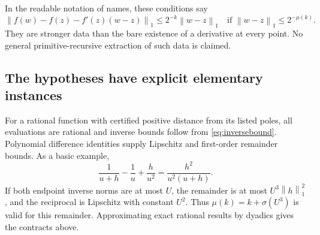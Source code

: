 \documentclass[11pt]{article}
\theoremstyle{definition}
\newcommand{\norm}[1]{\left\lVert#1\right\rVert_1}
\begin{document}
In the readable notation of names, these conditions say
\[
 \norm{f(w)-f(z)-f'(z)(w-z)}\le2^{-k}\norm{w-z}
 \quad\text{if }\norm{w-z}\le2^{-\mu(k)}.
\]
They are stronger data than the bare existence of a derivative at every
point. No general primitive-recursive extraction of such data is claimed.

\subsection{The hypotheses have explicit elementary instances}

For a rational function with certified positive distance from its listed
poles, all evaluations are rational and inverse bounds follow from
\eqref{eq:inversebound}. Polynomial difference identities supply
Lipschitz and first-order remainder bounds. As a basic example,
\begin{equation}\label{eq:inverseTaylor}
 \frac1{u+h}-\frac1u+\frac h{u^2}
       =\frac{h^2}{u^2(u+h)}.
\end{equation}
If both endpoint inverse norms are at most \(U\), the remainder is at
most \(U^3\norm h^2\), and the reciprocal is Lipschitz with constant
\(U^2\). Thus \(\mu(k)=k+\sigma(U^3)\) is valid for this remainder.
Approximating exact rational results by dyadics gives the contracts above.
\end{document}
